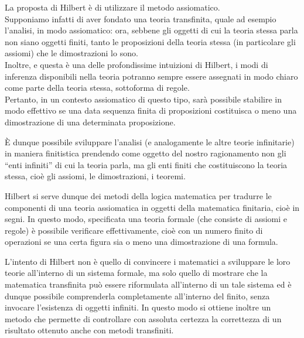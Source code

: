 La proposta di Hilbert è di utilizzare il metodo assiomatico.\\
Supponiamo infatti di aver fondato una teoria transfinita, quale ad esempio l'ana\-li\-si, in modo assiomatico: ora, sebbene gli oggetti di cui la teoria stessa parla non siano oggetti finiti, tanto le proposizioni della teoria stessa (in particolare gli assiomi) che le dimostrazioni lo sono.\\
Inoltre, e questa è una delle profondissime intuizioni di Hilbert, i modi di inferenza disponibili nella teoria potranno sempre essere assegnati in modo chiaro come parte della teoria stessa, sottoforma di regole.\\
Pertanto, in un contesto assiomatico di questo tipo, sarà possibile stabilire in modo effettivo se una data sequenza finita di proposizioni costituisca o meno una dimostrazione di una determinata proposizione.

\`{E} dunque possibile sviluppare l'analisi (e analogamente le altre teorie infinitarie) in maniera finitistica prendendo come oggetto del nostro ragionamento non gli ``enti infiniti'' di cui la teoria parla, ma gli enti finiti che costituiscono la teoria stessa, cioè gli assiomi, le dimostrazioni, i teoremi. 

Hilbert si serve dunque dei metodi della logica matematica per tradurre le componenti di una teoria assiomatica in oggetti della matematica finitaria, cioè in segni. In questo modo, specificata una teoria formale (che consiste di assiomi e regole) è possibile verificare effettivamente, cioè con un numero finito di operazioni se una certa figura sia o meno una dimostrazione di una formula.


L'intento di Hilbert non è quello di convincere i matematici a sviluppare le loro teorie all'interno di un sistema formale, ma solo quello di mostrare che la matematica transfinita può essere riformulata all'interno di un tale sistema ed è dunque possibile comprenderla completamente all'interno del finito, senza invocare l'esistenza di oggetti infiniti. In questo modo si ottiene inoltre un metodo che permette di controllare con assoluta certezza la correttezza di un risultato ottenuto anche con metodi transfiniti.

